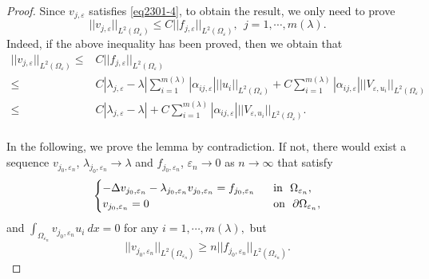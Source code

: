 \documentclass[11pt,reqno]{article}
\numberwithin{equation}{section}
\newcommand\e\varepsilon
\newcommand\la\lambda
\renewcommand\O\Omega
\begin{document}
     \begin{proof}
     Since $v_{j,\e}$ satisfies \eqref{eq2301-4},
to obtain the result, we only need to prove
   \begin{equation}\label{eq0531-1}
       ||{v}_{j,\e}||_{L^2(\O_\e)}\leq C||f_{j,\e}||_{L^2(\O_\e)},\ \ j=1,\cdots,m(\lambda).
   \end{equation}
   Indeed, if the above inequality has been proved, then we obtain that
   \begin{equation}
       \begin{aligned}
           ||v_{j,\e}||_{L^2(\O_\e)}
           \le& C||f_{j,\e}||_{L^2(\O_\e)}\\
           \le&C|\lambda_{j,\e}-\lambda|\sum_{i=1}^{m(\la)}|\alpha_{ij,\e} | || u_i||_{L^2(\O_\e)}+C\sum_{i=1}^{m(\la)}|\alpha_{ij,\e}| ||  V_{\e,u_i}||_{L^2(\O_\e)}\\
           \le&C|\lambda_{j,\e}-\lambda|+C\sum_{i=1}^{m(\la)}|\alpha_{ij,\e}| ||  V_{\e,u_i}||_{L^2(\O_\e)}.\\
           \end{aligned}
   \end{equation}

In the following, we prove the  lemma  by contradiction. If not, there would  exist a sequence ${v}_{j_0,\e_n}$, $\lambda_{j_0,\e_n}\to\lambda$ and $f_{j_0,\e_n}$, $\e_n\to 0$ as $n\to \infty$ that satisfy 
   \begin{equation}\label{eq11112025-1}
    \begin{cases}
       \displaystyle -\Delta {v}_{j_0,\e_n}-\lambda_{j_0,\e_n}{v}_{j_0,\e_n}=f_{j_0,\e_n}\ \ &\hbox{in} \ \ \O_{\e_n},\\
       \displaystyle {v}_{j_0,\e_n}=0\ \ &\hbox{on} \ \ \partial\O_{\e_n},\\
    \end{cases}
\end{equation}
and $      \displaystyle \int_{\O_{\e_n}}  v_{j_0,\e_n} u_i\ dx= 0$ for any $i=1,\cdots,m(\lambda),$
but 
\begin{equation*}
     ||{v}_{j_0,\e_n}||_{L^2(\O_{\e_n})}\geq n||f_{j_0,\e_n}||_{L^2(\O_{\e_n})}.
\end{equation*}




\end{proof}
\end{document}
